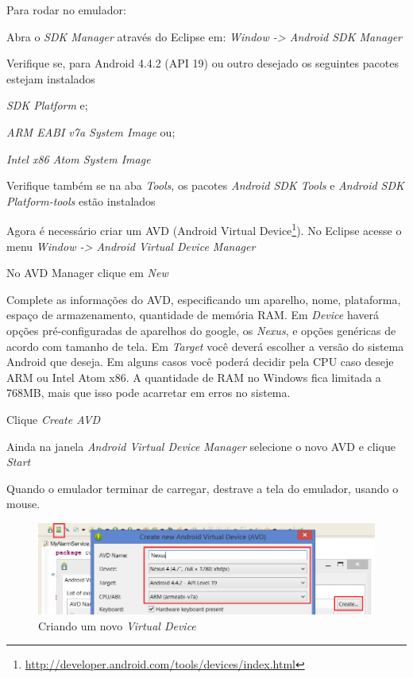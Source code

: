 \documentclass[a4paper,12pt,brazil,oneside]{book}
\begin{document}
\begin{singlespace}
\newpage 
Para rodar no emulador:
\be
\item Abra o \textit{SDK Manager} através do Eclipse em: \textit{Window -> Android SDK Manager}
\item Verifique se, para Android 4.4.2 (API 19) ou outro desejado os seguintes pacotes estejam instalados
	\bi
	\item \textit{SDK Platform} e;
	\item \textit{ARM EABI v7a System Image} ou;
	\item \textit{Intel x86 Atom System Image}
	\ei
\item Verifique também se na aba \textit{Tools}, os pacotes \textit{Android SDK Tools} e \textit{Android SDK Platform-tools} estão instalados
\item Agora é necessário criar um AVD (Android Virtual Device\footnote{\href{http://developer.android.com/tools/devices/index.html}{http://developer.android.com/tools/devices/index.html}}). No Eclipse acesse o menu \textit{Window -> Android Virtual Device Manager} 
\item No AVD Manager clique em \emph{New}
\item Complete as informações do AVD, especificando um aparelho, nome, plataforma, espaço de armazenamento, quantidade de memória RAM. Em \emph{Device} haverá opções pré-configuradas de aparelhos do google, os \emph{Nexus}, e opções genéricas de acordo com tamanho de tela. Em \emph{Target} você deverá escolher a versão do sistema Android que deseja. Em alguns casos você poderá decidir pela CPU caso deseje ARM ou Intel Atom x86. A quantidade de RAM no Windows fica limitada a 768MB, mais que isso pode acarretar em erros no sistema.

\item Clique \emph{Create AVD}
\item Ainda na janela \emph{Android Virtual Device Manager} selecione o novo AVD e clique \emph{Start}
\item Quando o emulador terminar de carregar, destrave a tela do emulador, usando o mouse.
\ee


\begin{figure}[H]
  \centering
  \includegraphics[width=.7\textwidth]{figuras/emulador/AddEmulador1.png}
  \caption{Criando um novo \emph{Virtual Device}}
  \label{fig:AddEmulador1}
\end{figure}


\end{singlespace}
\end{document}
